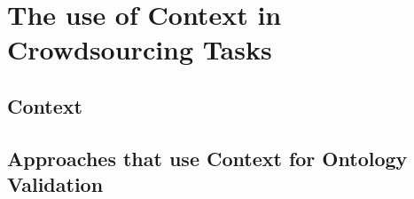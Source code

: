 \section{The use of Context in Crowdsourcing Tasks}
% 

\subsection{Context}


\subsection{Approaches that use Context for Ontology Validation}
